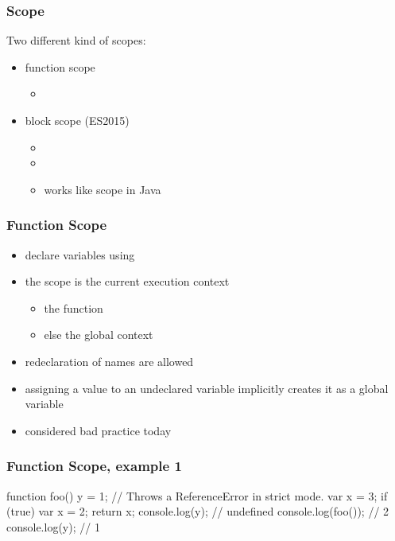 \begin{frame}[fragile] \frametitle{Scope}
Two different kind of scopes:
\begin{itemize}
  \item  function scope
  \begin{itemize}
    \item {}
  \end{itemize}
  \item block scope (ES2015)
  \begin{itemize}
    \item {}
    \item {}
    \item works like scope in Java
  \end{itemize}
\end{itemize}
\end{frame}

\begin{frame}[fragile] \frametitle{Function Scope}
\begin{itemize}
  \item declare variables using 
  \item the scope is the current execution context
  \begin{itemize}
    \item the function
    \item else the global context
  \end{itemize}
  \item  redeclaration of names are allowed
  \item assigning a value to an undeclared variable implicitly creates it as a global variable
  \item considered bad practice today
\end{itemize}
\end{frame}

\begin{frame}[fragile] \frametitle{Function Scope, example 1}

\begin{CodeBox}{}
function foo() {
  y = 1; // Throws a ReferenceError in strict mode.
  var x = 3;
  if (true) {
    var x = 2;
  }
  return x;
}
console.log(y); // undefined
console.log(foo()); // 2
console.log(y); // 1
\end{CodeBox}
\end{frame}

